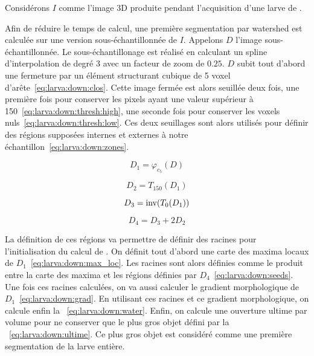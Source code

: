\documentclass[\main/main.tex]{subfiles}
\begin{document}
Considérons $I$ comme l'image 3D produite pendant l'acquisition d'une larve de \pz{}.

%
Afin de réduire le temps de calcul, une première segmentation par watershed est calculée sur une version sous\hyp{}échantillonnée de $I$.
%
Appelons $D$ l'image sous\hyp{}échantillonnée.
%
Le sous-échantillonage est réalisé en calculant un spline d'interpolation de degré 3 avec un facteur de zoom de $0.25$.
%
$D$ subit tout d'abord une fermeture par un élément structurant cubique de 5 voxel d'arête~\eqref{eq:larva:down:clos}.
%
Cette image fermée est alors seuillée deux fois, une première fois pour conserver les pixels ayant une valeur supérieur à 150~\eqref{eq:larva:down:thresh:high}, une seconde fois pour conserver les voxels nuls~\eqref{eq:larva:down:thresh:low}.
%
Ces deux seuillages sont alors utilisés pour définir des régions supposées internes et externes à notre échantillon~\eqref{eq:larva:down:zones}.

\begin{equation}
    \label{eq:larva:down:clos}
    D_1 = \varphi_{c_{5}}(D)
\end{equation}

\begin{equation}
    \label{eq:larva:down:thresh:high}
    D_2 = T_{150}(D_{1})
\end{equation}

\begin{equation}
    \label{eq:larva:down:thresh:low}
    D_3 = \operatorname{\textnormal{inv}}(T_{0}(D_{1}))
\end{equation}

\begin{equation}
    \label{eq:larva:down:zones}
    D_{4} = D_3 + 2D_{2} 
\end{equation}

%
La définition de ces régions va permettre de définir des racines pour l'initialisation du calcul de \watershed{}.
%
On définit tout d'abord une carte des maxima locaux de $D_1$~\eqref{eq:larva:down:max_loc}.
%
Les racines sont alors définies comme le produit entre la carte des maxima et les régions définies par $D_{4}$~\eqref{eq:larva:down:seeds}.
%
Une fois ces racines calculées, on va aussi calculer le gradient morphologique de $D_1$~\eqref{eq:larva:down:grad}.
%
En utilisant ces racines et ce gradient morphologique, on calcule enfin la \watershed{}~\eqref{eq:larva:down:water}.
%
Enfin, on calcule une ouverture ultime par volume pour ne conserver que le plus gros objet défini par la \watershed{}~\eqref{eq:larva:down:ultime}.
%
Ce plus gros objet est considéré comme une première segmentation de la larve entière.
\end{document}
